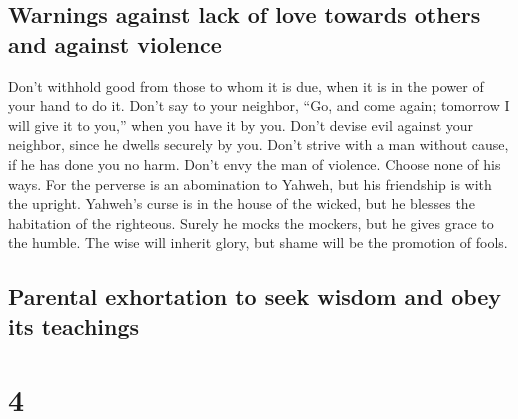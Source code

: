 \hypertarget{warnings-against-lack-of-love-towards-others-and-against-violence}{%
\subsection{Warnings against lack of love towards others and against
violence}\label{warnings-against-lack-of-love-towards-others-and-against-violence}}

 Don't withhold good from those to whom it is due, when
it is in the power of your hand to do it.  Don't say to
your neighbor, ``Go, and come again; tomorrow I will give it to you,''
when you have it by you.  Don't devise evil against your
neighbor, since he dwells securely by you.  Don't strive
with a man without cause, if he has done you no harm. 
Don't envy the man of violence. Choose none of his ways. 
For the perverse is an abomination to Yahweh, but his friendship is with
the upright.  Yahweh's curse is in the house of the
wicked, but he blesses the habitation of the righteous. 
Surely he mocks the mockers, but he gives grace to the humble.
 The wise will inherit glory, but shame will be the
promotion of fools.

\hypertarget{parental-exhortation-to-seek-wisdom-and-obey-its-teachings}{%
\subsection{Parental exhortation to seek wisdom and obey its
teachings}\label{parental-exhortation-to-seek-wisdom-and-obey-its-teachings}}

\hypertarget{section-3}{%
\section{4}\label{section-3}}

